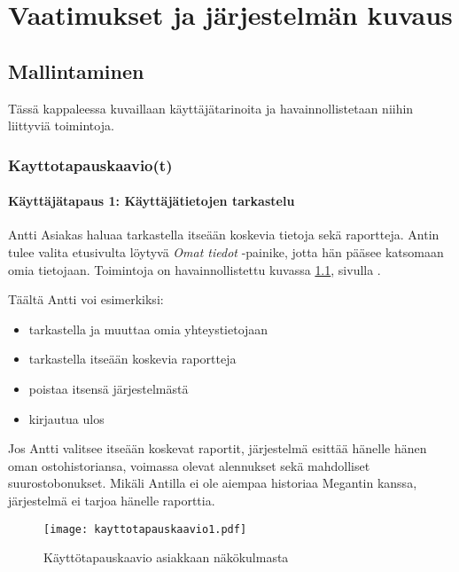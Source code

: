 \chapter{Vaatimukset ja järjestelmän kuvaus} %
\label{kuvaus} %
\thispagestyle{fancy} %


\section{Mallintaminen}  %
    Tässä kappaleessa kuvaillaan käyttäjätarinoita ja havainnollistetaan niihin liittyviä toimintoja. 

\subsection{Kayttotapauskaavio(t)}    %

\subsubsection{Käyttäjätapaus 1: Käyttäjätietojen tarkastelu}   %

    Antti Asiakas haluaa tarkastella itseään koskevia tietoja sekä raportteja. Antin tulee valita etusivulta löytyvä
    \textit{Omat tiedot} -painike, jotta hän pääsee katsomaan omia tietojaan. Toimintoja on havainnollistettu kuvassa \ref{img:kayttotapaus1}, sivulla \pageref{img:kayttotapaus1}.

    Täältä Antti voi esimerkiksi:

    \begin{itemize}
        \item tarkastella ja muuttaa omia yhteystietojaan
        \item tarkastella itseään koskevia raportteja
        \item poistaa itsensä järjestelmästä
        \item kirjautua ulos
    \end{itemize}

    Jos Antti valitsee itseään koskevat raportit, järjestelmä esittää hänelle hänen oman ostohistoriansa,
    voimassa olevat alennukset sekä mahdolliset suurostobonukset.
    Mikäli Antilla ei ole aiempaa historiaa Megantin kanssa, järjestelmä ei tarjoa hänelle raporttia.

    \begin{figure}[H]
        \centering
        \texttt{[image: kayttotapauskaavio1.pdf]}
        \caption{Käyttötapauskaavio asiakkaan näkökulmasta}
        \label{img:kayttotapaus1}
    \end{figure}

